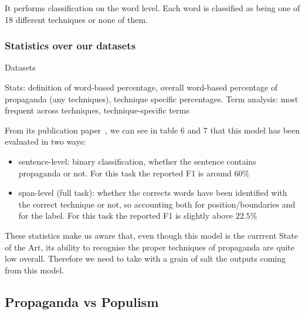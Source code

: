 It performs classification on the word level. Each word is classified as being one of 18 different techniques or none of them.


\subsubsection{\statusred Statistics over our datasets}

Datasets

Stats: definition of word-based percentage, overall word-based percentage of propaganda (any techniques), technique specific percentages. Term analysis: most frequent across techniques, technique-specific terms


From its publication paper~\cite{da2019fine}, we can see in table 6 and 7 that this model has been evaluated in two ways:

\begin{itemize}
    \item sentence-level: binary classification, whether the sentence contains propaganda or not. For this task the reported F1 is around $60\%$
    \item span-level (full task): whether the corrects words have been identified with the correct technique or not, so accounting both for position/boundaries and for the label. For this task the reported F1 is slightly above $22.5\%$
\end{itemize}

These statistics make us aware that, even though this model is the currrent State of the Art, its ability to recognise the proper techniques of propaganda are quite low overall.
Therefore we need to take with a grain of salt the outputs coming from this model.




\subsection{\statusorange Propaganda vs Populism}
\label{ssec:lp_techniques_populism_vs_propaganda}


